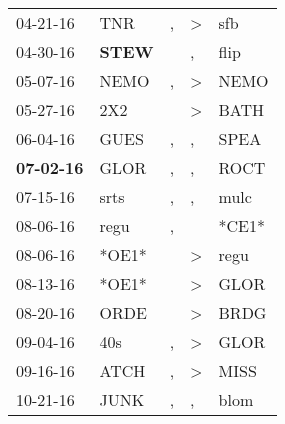 \begin{supertabular}{p{0.07\textwidth}p{0.06\textwidth}p{0.02\textwidth}p{0.02\textwidth}p{0.06\textwidth}}
          04-21-16\textsuperscript{} &            TNR\textsuperscript{} &                , &     \textgreater &            sfb\textsuperscript{} \\
          04-30-16\textsuperscript{} &  \textbf{STEW\textsuperscript{}} &                  &                , &           flip\textsuperscript{} \\
          05-07-16\textsuperscript{} &           NEMO\textsuperscript{} &                , &     \textgreater &           NEMO\textsuperscript{} \\
          05-27-16\textsuperscript{} &            2X2\textsuperscript{} &                  &     \textgreater &           BATH\textsuperscript{} \\
          06-04-16\textsuperscript{} &           GUES\textsuperscript{} &                , &                , &           SPEA\textsuperscript{} \\
 \textbf{07-02-16\textsuperscript{}} &           GLOR\textsuperscript{} &                , &                , &           ROCT\textsuperscript{} \\
          07-15-16\textsuperscript{} &           srts\textsuperscript{} &                , &                , &           mulc\textsuperscript{} \\
          08-06-16\textsuperscript{} &           regu\textsuperscript{} &                , &                  &                            *CE1* \\
          08-06-16\textsuperscript{} &                            *OE1* &                  &     \textgreater &           regu\textsuperscript{} \\
          08-13-16\textsuperscript{} &                            *OE1* &                  &     \textgreater &           GLOR\textsuperscript{} \\
          08-20-16\textsuperscript{} &           ORDE\textsuperscript{} &                  &     \textgreater &           BRDG\textsuperscript{} \\
          09-04-16\textsuperscript{} &            40s\textsuperscript{} &                , &     \textgreater &           GLOR\textsuperscript{} \\
          09-16-16\textsuperscript{} &           ATCH\textsuperscript{} &                , &     \textgreater &           MISS\textsuperscript{} \\
          10-21-16\textsuperscript{} &           JUNK\textsuperscript{} &                , &                , &           blom\textsuperscript{} \\

\end{supertabular}
